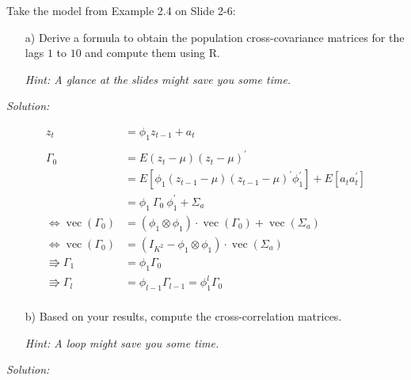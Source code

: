 \documentclass[12pt,a4paper]{article}
\renewcommand{\vec}{\operatorname{vec}}
\begin{document}
Take the model from Example 2.4 on Slide 2-6:

\begin{itemize}
  \item[a)] Derive a formula to obtain the population cross-covariance matrices for the lags $1$ to $10$ and compute them using R.
  \item[] \textit{Hint: A glance at the slides might save you some time.}
\end{itemize}

\emph{Solution:}

\begin{align*}
  z_t & = \phi_1 z_{t-1} + a_t\\
  \\
  \Gamma_0 & = E \left( z_t - \mu  \right) \left( z_t - \mu  \right)^{'}\\
  & = E \left[ \phi_1 \left( z_{t -1} - \mu \right) \left( z_{t -1} - \mu \right)^{'} \phi_1^{'} \right] + E \left[a_t a_t^{'} \right]\\
    & =\phi_1  \ \Gamma_0 \ \phi_1^{'} + \Sigma_a\\
  \Leftrightarrow \vec(\Gamma_0) &= (\phi_1 \otimes \phi_1) \cdot \vec(\Gamma_0) + \vec(\Sigma_a) \\
  \Leftrightarrow \vec(\Gamma_0) &= (I_{K^2} - \phi_1 \otimes \phi_1) \cdot \vec(\Sigma_a) \\
 \Rrightarrow \Gamma_1 & = \phi_1 \Gamma_0\\
 \Rrightarrow \Gamma_l & = \phi_{l-1} \Gamma_{l-1} = \phi_1^{l} \Gamma_0\\
\end{align*}

\begin{itemize}
  \item[b)] Based on your results, compute the cross-correlation matrices.
  \item[] \textit{Hint: A loop might save you some time.}
\end{itemize}

\emph{Solution:}
\end{document}
